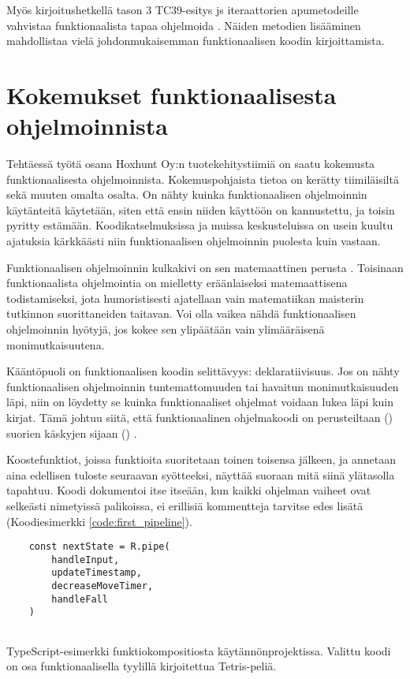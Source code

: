 Myös kirjoitushetkellä tason 3 TC39-esitys \gls{js} iteraattorien apumetodeille vahvistaa funktionaalista tapaa ohjelmoida \cite{tc39_iterator_helpers}. Näiden metodien lisääminen mahdollistaa vielä johdonmukaisemman funktionaalisen koodin kirjoittamista.

\section{Kokemukset funktionaalisesta ohjelmoinnista}


Tehtäessä työtä osana Hoxhunt Oy:n tuotekehitystiimiä on saatu kokemusta funktionaalisesta ohjelmoinnista. Kokemuspohjaista tietoa on kerätty tiimiläisiltä sekä muuten omalta osalta. On nähty kuinka funktionaalisen ohjelmoinnin käytänteitä käytetään, siten että ensin niiden käyttöön on kannustettu, ja toisin pyritty estämään. Koodikatselmuksissa ja muissa keskusteluissa on usein kuultu ajatuksia kärkkäästi niin funktionaalisen ohjelmoinnin puolesta kuin vastaan.

Funktionaalisen ohjelmoinnin kulkakivi on sen matemaattinen perusta \cite{computerphile_lambda,Tan2004}. Toisinaan funktionaalista ohjelmointia on mielletty eräänlaiseksi matemaattisena todistamiseksi, jota humoristisesti ajatellaan vain matematiikan maisterin tutkinnon suorittaneiden taitavan. Voi olla vaikea nähdä funktionaalisen ohjelmoinnin hyötyjä, jos kokee sen ylipäätään vain ylimääräisenä monimutkaisuutena.

Kääntöpuoli on funktionaalisen koodin selittävyys: deklaratiivisuus. Jos on nähty funktionaalisen ohjelmoinnin tuntemattomuuden tai havaitun monimutkaisuuden läpi, niin on löydetty se kuinka funktionaaliset ohjelmat voidaan lukea läpi kuin kirjat. Tämä johtuu siitä, että funktionaalinen ohjelmakoodi on perusteiltaan () suorien käskyjen sijaan () \cite{ms:fp_vs_imperative}.

Koostefunktiot, joissa funktioita suoritetaan toinen toisensa jälkeen, ja annetaan aina edellisen tuloste seuraavan syötteeksi, näyttää suoraan mitä siinä ylätasolla tapahtuu. Koodi dokumentoi itse itseään, kun kaikki ohjelman vaiheet ovat selkeästi nimetyissä palikoissa, ei erillisiä kommentteja tarvitse edes lisätä  (Koodiesimerkki \ref{code:first_pipeline}).

\begin{code}
    \begin{verbatim}
    const nextState = R.pipe(
        handleInput,
        updateTimestamp,
        decreaseMoveTimer,
        handleFall
    )
    
\end{verbatim}
    \caption{TypeScript-esimerkki funktiokompositiosta käytännönprojektissa. Valittu koodi on osa funktionaalisella tyylillä kirjoitettua Tetris-peliä.}
    \label{code:first_pipeline}
\end{code}


